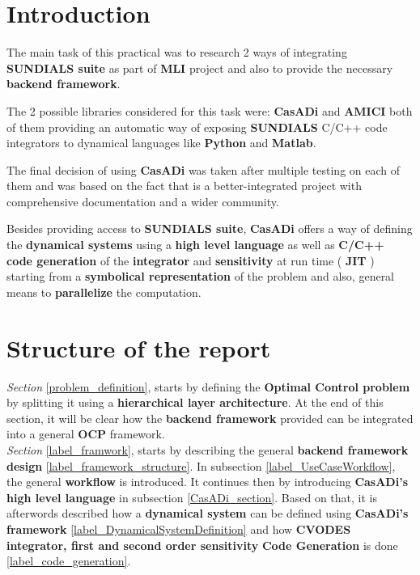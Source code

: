 \documentclass[12pt, letterpaper]{article}
\begin{document}
\section{Introduction}
The main task of this practical was to research 2 ways of integrating \textbf{SUNDIALS suite} as part of \textbf{MLI}  project and also to provide the necessary  \textbf{backend framework}.

The 2 possible libraries considered for this task were: \textbf{CasADi} \cite{Andersson2018} and \textbf{AMICI} \cite{frohlich2020amici} both of them providing an automatic way of exposing \textbf{SUNDIALS} C/C++ code integrators to dynamical languages like \textbf{Python} and \textbf{Matlab}.

The final decision of using \textbf{CasADi} was taken after multiple testing on each of them and was based on the fact that is a better-integrated project with comprehensive documentation and a wider community. 


Besides providing access to \textbf{SUNDIALS suite}, \textbf{CasADi} offers a way of defining the \textbf{dynamical systems} using a \textbf{high level language} as well as \textbf{C/C++ code generation} of the \textbf{integrator} and \textbf{sensitivity} at run time ( \textbf{JIT} ) starting from a \textbf{symbolical representation} of the problem and also, general means to \textbf{parallelize} the computation.
 
\section{Structure of the report}


\textit{Section} \ref{problem_definition}, starts by defining the \textbf{Optimal Control problem} by splitting it using a \textbf{hierarchical layer architecture}. At the end of this section, it will be clear how the \textbf{backend framework} provided can be integrated into a general \textbf{OCP} framework.\\



\textit{Section} \ref{label_framwork}, starts by describing the general \textbf{backend framework design} \ref{label_framework_structure}. In subsection \ref{label_UseCaseWorkflow}, the general \textbf{workflow} is introduced. It continues then by introducing \textbf{CasADi's high level language} in subsection \ref{CasADi_section}. Based on that, it is afterwords described how a \textbf{dynamical system} can be defined using \textbf{CasADi's framework} \ref{label_DynamicalSystemDefinition} and how \textbf{CVODES integrator, first and second order sensitivity} \textbf{Code Generation} is done \ref{label_code_generation}. 
\\
\end{document}
